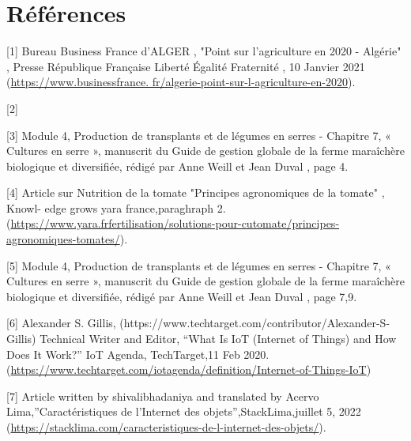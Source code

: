 \chapter*{Références} 
\label{chap:reference} 

        \newline

[1] Bureau Business France d’ALGER , "Point sur l’agriculture en 2020 - Algérie" , Presse
  République Française Liberté Égalité Fraternité , 10 Janvier 2021 (\url{https://www.businessfrance.
  fr/algerie-point-sur-l-agriculture-en-2020}).\newline
  
  [2]\newline

[3] Module 4, Production de transplants et de légumes en serres - Chapitre 7, « Cultures
  en serre », manuscrit du Guide de gestion globale de la ferme maraîchère biologique et
  diversifiée, rédigé par Anne Weill et Jean Duval , page 4.\newline
  
[4] Article sur Nutrition de la tomate "Principes agronomiques de la tomate" , Knowl-
  edge grows yara france,paraghraph 2.\newline (\url{https://www.yara.frfertilisation/solutions-pour-cutomate/principes-agronomiques-tomates/}).\newline

[5] Module 4, Production de transplants et de légumes en serres - Chapitre 7, « Cultures
en serre », manuscrit du Guide de gestion globale de la ferme maraîchère biologique et
diversifiée, rédigé par Anne Weill et Jean Duval , page 7,9.  \newline

[6] Alexander S. Gillis, (https://www.techtarget.com/contributor/Alexander-S-Gillis) Technical Writer and Editor, “What Is IoT (Internet of Things) and How Does It Work?” IoT Agenda, TechTarget,11 Feb 2020. (\url{https://www.techtarget.com/iotagenda/definition/Internet-of-Things-IoT})\newline

[7] Article written by shivalibhadaniya and translated by Acervo Lima,”Caractéristiques de l’Internet des objets”,StackLima,juillet 5, 2022\newline
(\url{https://stacklima.com/caracteristiques-de-l-internet-des-objets/}).